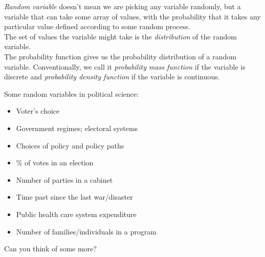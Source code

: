 \documentclass[11pt]{article}
\begin{document}
	\emph{Random variable} doesn't mean we are picking any variable randomly,	but a variable that can take some array of values, with the probability that it takes any particular value defined according to some random process.\\

	The set of values the variable might take is the  \emph{distribution} of the random variable.\\

	The probability function gives us the probability distribution of a random variable. Conventionally, we call it \emph{probability mass function} if the variable is discrete and \emph{probability density function} if the variable is continuous.

	Some random variables in political science:
	
	\begin{itemize}
		\item Voter's choice
		\item Government regimes; electoral systems
		\item Choices of policy and policy paths
		\item \% of votes in an election
		\item Number of parties in a cabinet
		\item Time past since the last war/disaster
		\item Public health care system expenditure
		\item Number of families/individuals in a program
	\end{itemize}
	Can you think of some more?
\end{document}
